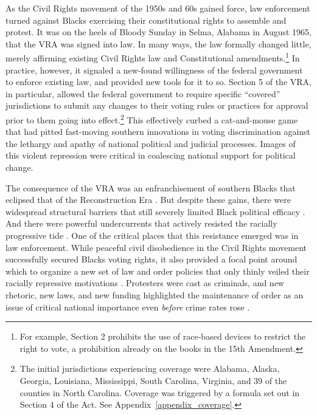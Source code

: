\documentclass[12pt]{article}
\begin{document}
As the Civil Rights movement of the 1950s and 60s gained force, law enforcement turned against Blacks exercising their constitutional rights to assemble and protest.  It was on the heels of Bloody Sunday in Selma, Alabama in August 1965, that the VRA was signed into law.  In many ways, the law formally changed little, merely affirming existing Civil Rights law and Constitutional amendments.\footnote{For example, Section 2 prohibits the use of race-based devices to restrict the right to vote, a prohibition already on the books in the 15th Amendment.}  In practice, however, it signaled a new-found willingness of the federal government to enforce existing law, and provided new tools for it to so.  Section 5 of the VRA, in particular, allowed the federal government to require specific ``covered'' jurisdictions to submit any changes to their voting rules or practices for approval prior to them going into effect.\footnote{The initial jurisdictions experiencing coverage were Alabama, Alaska, Georgia, Louisiana, Mississippi, South Carolina, Virginia, and 39 of the counties in North Carolina.  Coverage was triggered by a formula set out in Section 4 of the Act.  See Appendix~\ref{appendix_coverage}.}  This effectively curbed a cat-and-mouse game that had pitted fast-moving southern innovations in voting discrimination against the lethargy and apathy of national political and judicial processes. Images of this violent repression were critical in coalescing national support for political change.




The consequence of the VRA was an enfranchisement of southern Blacks that eclipsed that of the Reconstruction Era .  But despite these gains, there were widespread structural barriers that still severely limited Black political efficacy .  And there were powerful undercurrents that actively resisted the racially progressive tide .  One of the critical places that this resistance emerged was in law enforcement.  While peaceful civil disobedience in the Civil Rights movement successfully secured Blacks voting rights, it also provided a focal point around which to organize a new set of law and order policies that only thinly veiled their racially repressive motivations .  Protesters were cast as criminals, and new rhetoric, new laws, and new funding highlighted the maintenance of order as an issue of critical national importance even \emph{before} crime rates rose .
\end{document}
